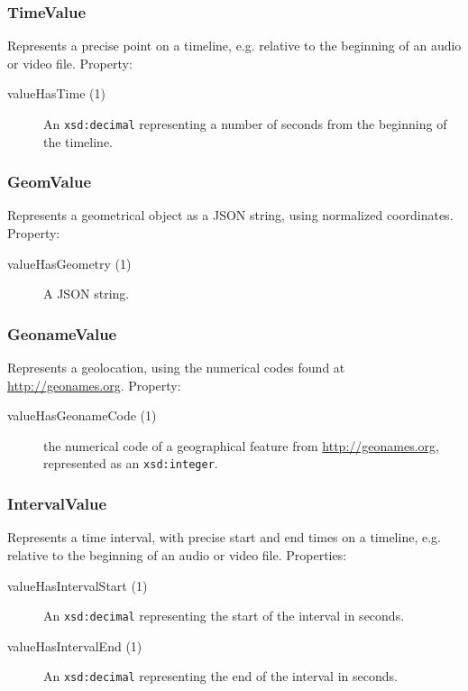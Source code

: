 \documentclass[12pt, a4paper]{article}
\begin{document}
\subsubsection{TimeValue}

Represents a precise point on a timeline, e.g. relative to the beginning of an audio or video file. Property:

\begin{description}
	\item[valueHasTime (1)]	An \texttt{xsd:decimal} representing a number of seconds from the beginning of the timeline.
\end{description}

\subsubsection{GeomValue}

Represents a geometrical object as a JSON string, using normalized coordinates. Property:

\begin{description}
	\item[valueHasGeometry (1)] A JSON string.
\end{description}

\subsubsection{GeonameValue}

Represents a geolocation, using the numerical codes found at \url{http://geonames.org}. Property:

\begin{description}
	\item[valueHasGeonameCode (1)] the numerical code of a geographical feature from \url{http://geonames.org}, represented as an \texttt{xsd:integer}.
\end{description}

\subsubsection{IntervalValue}

Represents a time interval, with precise start and end times on a timeline, e.g. relative to the beginning of an audio or video file. Properties:

\begin{description}
	\item[valueHasIntervalStart (1)] An \texttt{xsd:decimal} representing the start of the interval in seconds.
	\item[valueHasIntervalEnd (1)]	An \texttt{xsd:decimal} representing the end of the interval in seconds.
\end{description}
\end{document}
